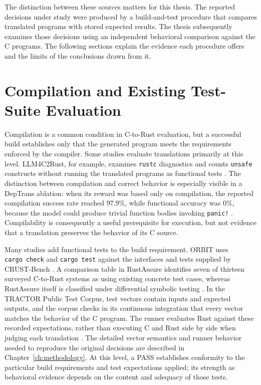 The distinction between these sources matters for this thesis. The
reported decisions under study were produced by a build-and-test
procedure that compares translated programs with stored expected
results. The thesis subsequently examines those decisions using an
independent behavioral comparison against the C programs. The following
sections explain the evidence each procedure offers and the limits of
the conclusions drawn from it.

\section{Compilation and Existing Test-Suite Evaluation}
\label{sec:rw-compilation}\label{sec:rw-evaluation}

Compilation is a common condition in C-to-Rust evaluation, but a
successful build establishes only that the generated program meets the
requirements enforced by the compiler. Some studies evaluate
translations primarily at this level. LLM4C2Rust, for example, examines
\texttt{rustc} diagnostics and counts \texttt{unsafe} constructs without
running the translated programs as functional tests
\cite{bedell2026llm4c2rust}. The distinction between compilation and
correct behavior is especially visible in a DepTrans ablation: when its
reward was based only on compilation, the reported compilation success
rate reached 97.9\%, while functional accuracy was 0\%, because the
model could produce trivial function bodies invoking \texttt{panic!}
\cite{feng2026deptrans}. Compilability is consequently a useful
prerequisite for execution, but not evidence that a translation
preserves the behavior of its C source.

Many studies add functional tests to the build requirement. ORBIT uses
\texttt{cargo\ check} and \texttt{cargo\ test} against the interfaces
and tests supplied by CRUST-Bench \cite{farrukh2026orbit}. A comparison
table in RustAssure identifies seven of thirteen surveyed C-to-Rust
systems as using existing concrete test cases, whereas RustAssure itself
is classified under differential symbolic testing
\cite{bai2025rustassure}. In the TRACTOR Public Test Corpus, test
vectors contain inputs and expected outputs, and the corpus checks in its
continuous integration that every vector matches the behavior of the C
program. The runner evaluates Rust against these recorded expectations,
rather than executing C and Rust side by side when judging each
translation \cite{tractor-test-corpus,okhravi2026tractorbenchmark}. The
detailed vector semantics and runner behavior needed to reproduce the
original decisions are described in Chapter~\ref{ch:methodology}. At this level, a PASS
establishes conformity to the particular build requirements and test
expectations applied; its strength as behavioral evidence depends on the
content and adequacy of those tests.

